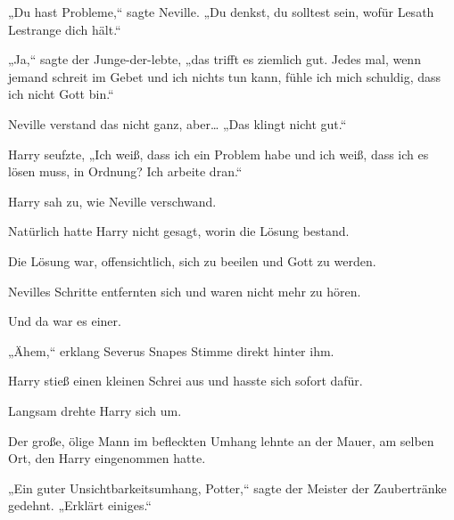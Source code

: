 „Du hast Probleme,“ sagte Neville. „Du denkst, du solltest sein, wofür Lesath Lestrange dich hält.“

„Ja,“ sagte der Junge-der-lebte, „das trifft es ziemlich gut. Jedes mal, wenn jemand schreit im Gebet und ich nichts tun kann, fühle ich mich schuldig, dass ich nicht Gott bin.“

Neville verstand das nicht ganz, aber… „Das klingt nicht gut.“

Harry seufzte, „Ich weiß, dass ich ein Problem habe und ich weiß, dass ich es lösen muss, in Ordnung? Ich arbeite dran.“

\later

Harry sah zu, wie Neville verschwand.

Natürlich hatte Harry nicht gesagt, worin die Lösung bestand.

Die Lösung war, offensichtlich, sich zu beeilen und Gott zu werden.

Nevilles Schritte entfernten sich und waren nicht mehr zu hören.

Und da war es einer.

„Ähem,“ erklang Severus Snapes Stimme direkt hinter ihm.

Harry stieß einen kleinen Schrei aus und hasste sich sofort dafür.

Langsam drehte Harry sich um.

Der große, ölige Mann im befleckten Umhang lehnte an der Mauer, am selben Ort, den Harry eingenommen hatte.

„Ein guter Unsichtbarkeitsumhang, Potter,“ sagte der Meister der Zaubertränke gedehnt. „Erklärt einiges.“

